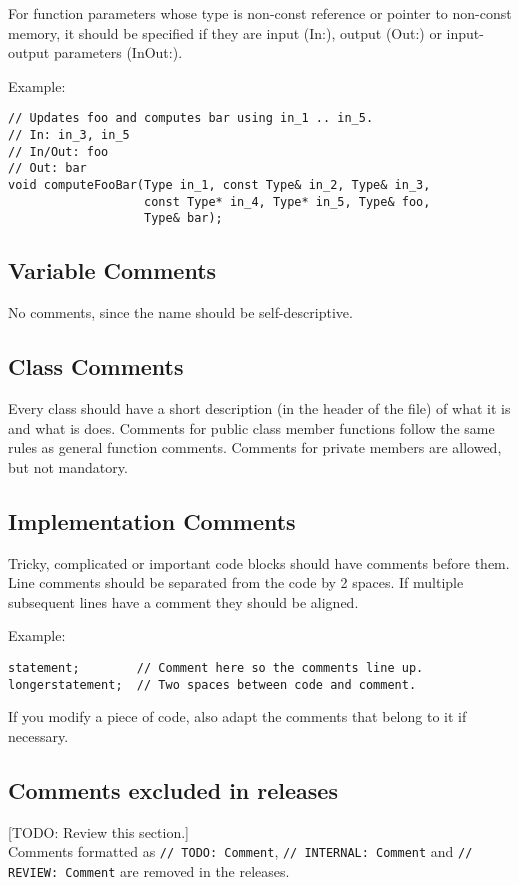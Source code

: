 \documentclass[a4paper]{article}
\newcommand{\inlinecode}[1]{\lstinline|#1|}
\begin{document}
For function parameters whose type is non-const reference or pointer to non-const memory,
it should be specified if they are input (In:), output (Out:) or input-output parameters (InOut:).

Example:
\begin{lstlisting}
// Updates foo and computes bar using in_1 .. in_5.
// In: in_3, in_5
// In/Out: foo
// Out: bar
void computeFooBar(Type in_1, const Type& in_2, Type& in_3,
                   const Type* in_4, Type* in_5, Type& foo,
                   Type& bar);
\end{lstlisting}

\subsection{Variable Comments}

No comments, since the name should be self-descriptive.

\subsection{Class Comments}

Every class should have a short description (in the header of the file) of what it is and what is does.
Comments for public class member functions follow the same rules as general function comments.
Comments for private members are allowed, but not mandatory.

\subsection{Implementation Comments}

Tricky, complicated or important code blocks should have comments before them.
Line comments should be separated from the code by 2 spaces.
If multiple subsequent lines have a comment they should be aligned.

Example:
\begin{lstlisting}
statement;        // Comment here so the comments line up.
longerstatement;  // Two spaces between code and comment.
\end{lstlisting}

If you modify a piece of code, also adapt the comments that belong to it if necessary.

\subsection{Comments excluded in releases}
[TODO: Review this section.]\\
Comments formatted as \inlinecode{// TODO: Comment}, \inlinecode{// INTERNAL: Comment} and \inlinecode{// REVIEW: Comment} are removed in the releases.
\end{document}
